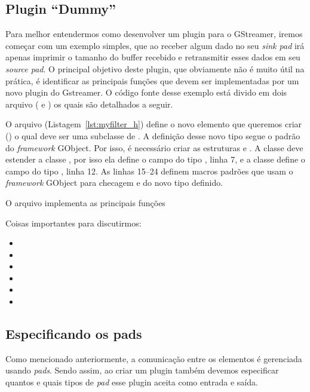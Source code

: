 \subsection*{Plugin ``Dummy''}
Para melhor entendermos como desenvolver um plugin para o GStreamer, iremos
começar com um exemplo simples, que ao receber algum dado no seu \emph{sink
pad} irá apenas imprimir o tamanho do buffer recebido e retransmitir esses
dados em seu \emph{source pad}.  O principal objetivo deste plugin, que
obviamente não é muito útil na prática, é identificar as principais funções que
devem ser implementadas por um novo plugin do Gstreamer.  O código fonte desse
exemplo está divido em dois arquivo ( e ) os quais
são detalhados a seguir.

O arquivo  (Listagem~\ref{lst:myfilter_h}) define o novo elemento
que queremos criar () o qual deve ser uma subclasse de
.  A definição desse novo tipo segue o padrão do \emph{framework}
GObject.  Por isso, é necessário criar as estruturas  e
.  A classe  deve estender a classe
, por isso ela define o campo  do tipo ,
linha 7, e a classe  define o campo  do
tipo , linha 12.  As linhas 15--24 definem macros padrões
que usam o \emph{framework} GObject para checagem e  do novo tipo
definido.



O arquivo  implementa as principais funções



Coisas importantes para discutirmos:
\begin{itemize}
  \item {}
  \item {} 
  \item {} 
  \item {}
  \item {}
  \item {}
\end{itemize}

\subsection*{Especificando os pads}
Como mencionado anteriormente, a comunicação entre os elementos é gerenciada
usando \emph{pads}.  Sendo assim, ao criar um plugin também devemos especificar
quantos e quais tipos de \emph{pad} esse plugin aceita como entrada e saída.

